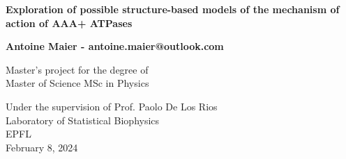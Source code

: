 \begin{titlepage}
    \begin{center}
        \vspace*{1cm}
            
        \Huge
        \textbf{Exploration of possible structure-based models of the mechanism of action of AAA+ ATPases}
            
        \vspace{0.5cm}
        \LARGE
            
        \vspace{1.5cm}
            
        \textbf{Antoine Maier - antoine.maier@outlook.com}
            
        \vfill
            
        Master's project for the degree of\\
        Master of Science MSc in Physics
            
        \vspace{0.8cm}
        \Large
        
        Under the supervision of Prof. Paolo De Los Rios\\
        Laboratory of Statistical Biophysics\\
        EPFL\\
        February 8, 2024
            
    \end{center}
\end{titlepage}